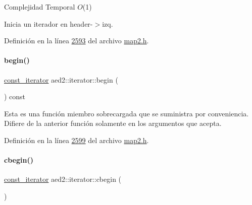 \begin{DoxyDescription}
\item[Complejidad Temporal]$O$(1)
\end{DoxyDescription}Inicia un iterador en header-\/$>$izq. 

Definición en la línea \hyperlink{map2_8h_source_l02593}{2593} del archivo \hyperlink{map2_8h_source}{map2.\+h}.

\mbox{\label{classaed2_1_1iterator_a8a5783a3ab356cd6247b98d302d9130c_a8a5783a3ab356cd6247b98d302d9130c}} 
\paragraph{\texorpdfstring{begin()}{begin()}\hspace{0.1cm}{\footnotesize\ttfamily [2/2]}}
{\footnotesize\ttfamily \hyperlink{classaed2_1_1iterator_1_1const__iterator}{const\+\_\+iterator} aed2\+::iterator\+::begin (\begin{DoxyParamCaption}{ }\end{DoxyParamCaption}) const\hspace{0.3cm}{\ttfamily [inline]}}

Esta es una función miembro sobrecargada que se suministra por conveniencia. Difiere de la anterior función solamente en los argumentos que acepta. 

Definición en la línea \hyperlink{map2_8h_source_l02599}{2599} del archivo \hyperlink{map2_8h_source}{map2.\+h}.

\mbox{\label{classaed2_1_1iterator_a89cca73bd2e4df39de7c412c441d6da1_a89cca73bd2e4df39de7c412c441d6da1}} 
\paragraph{\texorpdfstring{cbegin()}{cbegin()}}
{\footnotesize\ttfamily \hyperlink{classaed2_1_1iterator_1_1const__iterator}{const\+\_\+iterator} aed2\+::iterator\+::cbegin (\begin{DoxyParamCaption}{ }\end{DoxyParamCaption})\hspace{0.3cm}{\ttfamily [inline]}}

